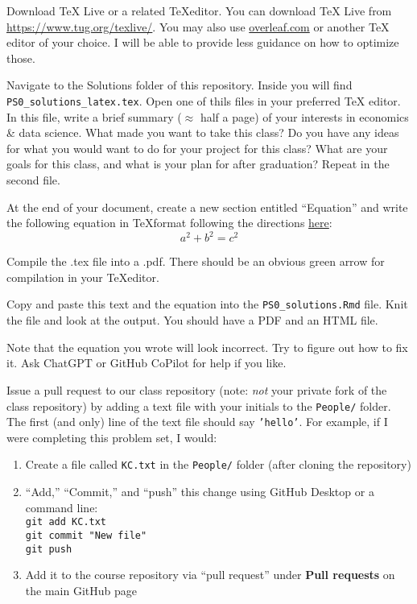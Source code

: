 \documentclass[12pt,english]{exam}
\begin{document}
\begin{questions}
\question Download TeX Live or a related \TeX editor. You can download TeX Live from \url{https://www.tug.org/texlive/}. You may also use \url{overleaf.com} or another TeX editor of your choice. I will be able to provide less guidance on how to optimize those.

\question Navigate to the Solutions folder of this repository. Inside you will find \texttt{PS0\_solutions\_latex.tex}. Open one of thils files in your preferred TeX editor. In this file, write a brief summary ($\approx$ half a page) of your interests in economics \& data science. What made you want to take this class? Do you have any ideas for what you would want to do for your project for this class? What are your goals for this class, and what is your plan for after graduation? Repeat in the second file. 

\question At the end of your document, create a new section entitled ``Equation'' and write the following equation in \TeX format following the directions \href{https://www.overleaf.com/learn/latex/mathematical_expressions}{here}:
\begin{equation}
	a^{2} + b^{2} = c^{2}
\end{equation}

\question Compile the .tex file into a .pdf. There should be an obvious green arrow for compilation in your \TeX editor. 

Copy and paste this text and the equation into the \texttt{PS0\_solutions.Rmd} file. Knit the file and look at the output. You should have a PDF and an HTML file.

Note that the equation you wrote will look incorrect. Try to figure out how to fix it. Ask ChatGPT or GitHub CoPilot for help if you like. 

\question Issue a pull request to our class repository (note: \emph{not} your private fork of the class repository) by adding a text file with your initials to the \texttt{People/} folder. The first (and only) line of the text file should say \texttt{'hello'}. For example, if I were completing this problem set, I would:

\begin{enumerate}
  \item Create a file called \texttt{KC.txt} in the \texttt{People/} folder (after cloning the repository)
  \item ``Add,'' ``Commit,'' and ``push'' this change using GitHub Desktop or a command line: \\
  \texttt{git add KC.txt} \\
  \texttt{git commit "New file"} \\
  \texttt{git push} 
  \item Add it to the course repository via ``pull request'' under \textbf{Pull requests} on the main GitHub page
\end{enumerate}

\end{questions}
\end{document}

